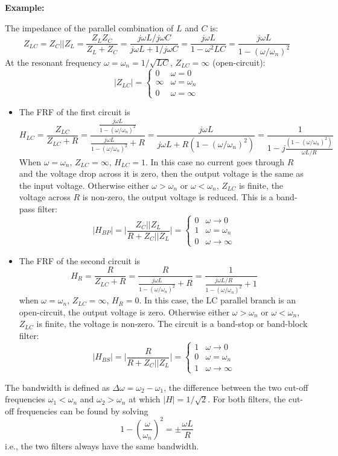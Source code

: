{\bf Example:} 


The impedance of the parallel combination of $L$ and $C$ is:
\[ 
Z_{LC}=Z_C||Z_L=\frac{Z_LZ_C}{Z_L+Z_C}
=\frac{j\omega L/j\omega C}{j\omega L+1/j\omega C}
=\frac{j\omega L}{1-\omega^2 LC}
=\frac{j\omega L}{1-(\omega/\omega_n)^2 } 
\]
At the resonant frequency $\omega=\omega_n=1/\sqrt{LC}$, $Z_{LC}=\infty$
(open-circuit):
\[
|Z_{LC}|=\left\{\begin{array}{cc}0 & \omega=0\\\infty & \omega=\omega_n\\
0 & \omega=\infty\end{array}\right.
\]

\begin{itemize}
\item The FRF of the first circuit is
  \[
  H_{LC}=\frac{Z_{LC}}{Z_{LC}+R}=\frac{\frac{j\omega L}{1-(\omega/\omega_n)^2}}{
    \frac{j\omega L}{1-(\omega/\omega_n)^2 } +R}
  =\frac{j\omega L}{j\omega L+R(1-(\omega/\omega_n)^2)}
  =\frac{1}{1-j\frac{(1-(\omega/\omega_n)^2)}{\omega L/R}}
  \]
  When $\omega=\omega_n$, $Z_{LC}=\infty$, $H_{LC}=1$. In this case
  no current goes through $R$ and the voltage drop across it is zero, 
  then the output voltage is the same as the input voltage. Otherwise 
  either $\omega>\omega_n$ or $\omega<\omega_n$, $Z_{LC}$ is finite, the 
  voltage across $R$ is non-zero, the output voltage is reduced. This is
  a band-pass filter:
  \[ 
  |H_{BP}|=\bigg|\frac{Z_C||Z_L}{R+Z_C||Z_L}\bigg|
  =\left\{\begin{array}{cc}0&\omega\rightarrow 0\\
  1&\omega=\omega_n\\ 0&\omega\rightarrow\infty\end{array}\right.
  \]

\item The FRF of the second circuit is
  \[
  H_R=\frac{R}{Z_{LC}+R}=\frac{R}{\frac{j\omega L}{1-(\omega/\omega_n)^2}+R}
  =\frac{1}{\frac{j\omega L/R}{1-(\omega/\omega_n)^2 }+1}
  \]
  when $\omega=\omega_n$, $Z_{LC}=\infty$, $H_R=0$. In this case,
  the LC parallel branch is an open-circuit, the output voltage is 
  zero. Otherwise either $\omega>\omega_n$ or $\omega<\omega_n$, 
  $Z_{LC}$ is finite, the voltage is non-zero. The circuit is a 
  band-stop or band-block filter:
  \[ 
  |H_{BS}|=\bigg|\frac{R}{R+Z_C||Z_L}\bigg|
  =\left\{\begin{array}{cc}1&\omega\rightarrow 0\\
  0&\omega=\omega_n\\ 1&\omega\rightarrow\infty\end{array}\right.
  \]

\end{itemize}
The bandwidth is defined as $\Delta\omega=\omega_2-\omega_1$, the
difference between the two cut-off frequencies $\omega_1<\omega_n$ 
and $\omega_2>\omega_n$ at which $|H|=1/\sqrt{2}$. For both filters,
the cut-off frequencies can be found by solving
\[
1-\left(\frac{\omega}{\omega_n}\right)^2 =\pm \frac{\omega L}{R}
\]
i.e., the two filters always have the same bandwidth.

